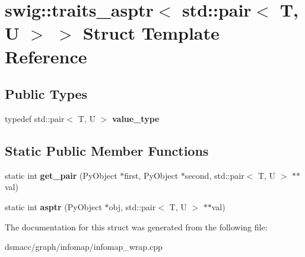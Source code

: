 \hypertarget{structswig_1_1traits__asptr_3_01std_1_1pair_3_01T_00_01U_01_4_01_4}{}\section{swig\+:\+:traits\+\_\+asptr$<$ std\+:\+:pair$<$ T, U $>$ $>$ Struct Template Reference}
\label{structswig_1_1traits__asptr_3_01std_1_1pair_3_01T_00_01U_01_4_01_4}
\subsection*{Public Types}
\begin{DoxyCompactItemize}
\item 
\mbox{\label{structswig_1_1traits__asptr_3_01std_1_1pair_3_01T_00_01U_01_4_01_4_a1cc2b1f24022176235ac0ede7646c041}} 
typedef std\+::pair$<$ T, U $>$ {\bfseries value\+\_\+type}
\end{DoxyCompactItemize}
\subsection*{Static Public Member Functions}
\begin{DoxyCompactItemize}
\item 
\mbox{\label{structswig_1_1traits__asptr_3_01std_1_1pair_3_01T_00_01U_01_4_01_4_a7ba7929bef6f511c92ff9a847edf9bf0}} 
static int {\bfseries get\+\_\+pair} (Py\+Object $\ast$first, Py\+Object $\ast$second, std\+::pair$<$ T, U $>$ $\ast$$\ast$val)
\item 
\mbox{\label{structswig_1_1traits__asptr_3_01std_1_1pair_3_01T_00_01U_01_4_01_4_a331a484c8263c370bd86a3a2d655614a}} 
static int {\bfseries asptr} (Py\+Object $\ast$obj, std\+::pair$<$ T, U $>$ $\ast$$\ast$val)
\end{DoxyCompactItemize}


The documentation for this struct was generated from the following file\+:\begin{DoxyCompactItemize}
\item 
dsmacc/graph/infomap/infomap\+\_\+wrap.\+cpp\end{DoxyCompactItemize}
